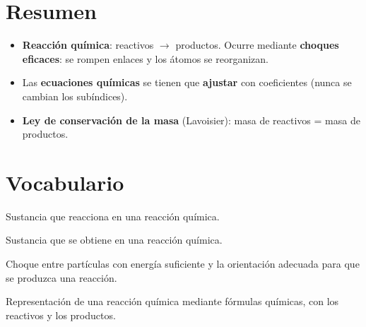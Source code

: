 

\section*{Resumen}

\begin{itemize}
    \item \textbf{Reacción química}: reactivos \(\to\) productos. Ocurre mediante \textbf{choques eficaces}: se rompen enlaces y los átomos se reorganizan.
    \item Las \textbf{ecuaciones químicas} se tienen que \textbf{ajustar} con coeficientes (nunca se cambian los subíndices).
    \item \textbf{Ley de conservación de la masa} (Lavoisier): masa de reactivos = masa de productos.
\end{itemize}

\section{Vocabulario}

\begin{vocabulary}
    Sustancia que reacciona en una reacción química.
\end{vocabulary}

\begin{vocabulary}
    Sustancia que se obtiene en una reacción química.
\end{vocabulary}

\begin{vocabulary}
    Choque entre partículas con energía suficiente y la orientación adecuada para que se produzca una reacción.
\end{vocabulary}

\begin{vocabulary}
    Representación de una reacción química mediante fórmulas químicas, con los reactivos y los productos.
\end{vocabulary}

